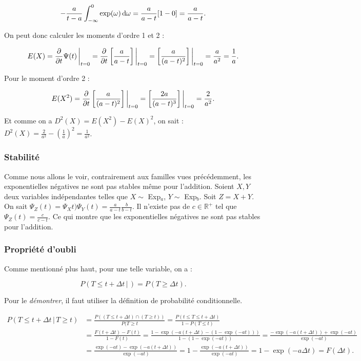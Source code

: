 \documentclass{article}
\renewcommand{\pd}[1]{\frac {\partial}{\partial #1}}
\begin{document}
			\[-\frac a{t-a}\int_{-\infty}^0\exp(\omega)\dif\omega = \frac a{a-t}[1-0] = \frac a{a-t}.\]

			On peut donc calculer les moments d'ordre 1 et 2 :

			\[E(X) = \pd t\Psi(t)\sVert[3]_{t=0} = \pd t\left[\frac a{a-t}\right]\sVert[3]_{t=0} = \left[\frac a{(a-t)^2}\right]\sVert[3]_{t=0} = \frac a{a^2} = \frac 1a.\]

			Pour le moment d'ordre 2 :

			\[E(X^2) = \pd t\left[\frac a{(a-t)^2}\right]\sVert[3]_{t=0} = \left[\frac {2a}{(a-t)^3}\right]\sVert[3]_{t=0} = \frac 2{a^2}.\]

			Et comme on a $D^2(X) = E(X^2) - E(X)^2$, on sait : $D^2(X) = \frac 2{a^2} - \left(\frac 1a\right)^2 = \frac 1{a^2}$.

		\subsubsection{Stabilité}
			Comme nous allons le voir, contrairement aux familles vues précédemment, les exponentielles négatives ne sont pas stables même pour l'addition. Soient $X, Y$ deux
			variables indépendantes telles que $X \sim $ Exp$_a$, $Y \sim $ Exp$_b$. Soit $Z = X + Y$. On sait $\Psi_Z(t) = \Psi_Xt)\Psi_Y(t) = \frac a{a-t}\frac b{b-t}$.
			Il n'existe pas de $c \in \mathbb R^+$ tel que $\Psi_Z(t) = \frac c{c-t}$. Ce qui montre que les exponentielles négatives ne sont pas stables pour l'addition.

		\subsubsection{Propriété d'oubli}
			Comme mentionné plus haut, pour une telle variable, on a :

			\[P(T \leq t + \Delta t \, | \, ) = P(T \geq \Delta t).\]

			Pour le \textit{démontrer}, il faut utiliser la définition de probabilité conditionnelle.

			\[\begin{aligned}
				P(T \leq t + \Delta t \, | \, T \geq t) &= \frac {P((T \leq t + \Delta t) \cap (T \geq t))}{P(T \geq t} = \frac {P(t \leq T \leq t+\Delta t)}{1-P(T \leq t)} \\
				&= \frac {F(t+\Delta t) - F(t)}{1-F(t)} = \frac {1-\exp(-a(t+\Delta t) - (1-\exp(-at)))}{1-(1-\exp(-at))} = \frac {-\exp(-a(t+\Delta t)) + \exp(-at)}{\exp(-at)} \\
				&= \frac {\exp(-at) - \exp(-a(t+\Delta t))}{\exp(-at)} = 1 - \frac {\exp(-a(t+\Delta t))}{\exp(-at)} = 1 - \exp(-a\Delta t) = F(\Delta t).
			\end{aligned}\]
\end{document}

